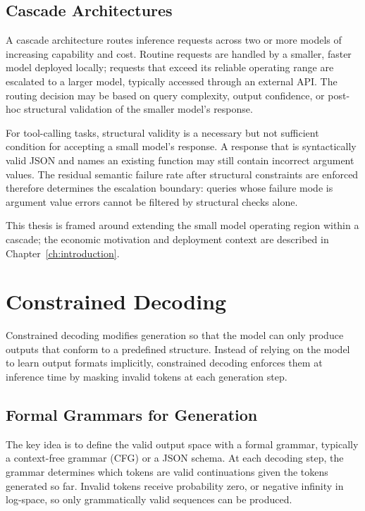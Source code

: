 \subsection{Cascade Architectures}

A cascade architecture routes inference requests across two or
more models of increasing capability and cost. Routine requests
are handled by a smaller, faster model deployed locally; requests
that exceed its reliable operating range are escalated to a larger
model, typically accessed through an external API. The routing
decision may be based on query complexity, output confidence, or
post-hoc structural validation of the smaller model's response.

For tool-calling tasks, structural validity is a necessary but not
sufficient condition for accepting a small model's response. A
response that is syntactically valid JSON and names an existing
function may still contain incorrect argument values. The residual
semantic failure rate after structural constraints are enforced
therefore determines the escalation boundary: queries whose failure
mode is argument value errors cannot be filtered by structural
checks alone.

This thesis is framed around extending the small model operating
region within a cascade; the economic motivation and deployment
context are described in Chapter~\ref{ch:introduction}.

\section{Constrained Decoding} \label{sec:bg-constrained-decoding}

Constrained decoding modifies generation so that the model can only produce outputs that conform to a predefined structure. Instead of relying on the model to learn output formats implicitly, constrained decoding enforces them at inference time by masking invalid tokens at each generation step.

\subsection{Formal Grammars for Generation}

The key idea is to define the valid output space with a formal grammar, typically a context-free grammar (CFG) or a JSON schema. At each decoding step, the grammar determines which tokens are valid continuations given the tokens generated so far. Invalid tokens receive probability zero, or negative infinity in log-space, so only grammatically valid sequences can be produced.

